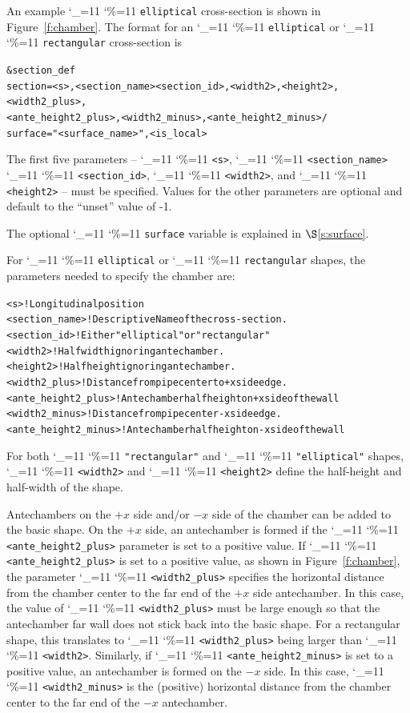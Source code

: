 \documentclass[11pt,openany]{report}
\newcommand{\sref}[1]{$\S$\ref{#1}}
\newcommand\ttcmd{\begingroup\catcode`\_=11 \catcode`\%=11 \dottcmd}
\newcommand\dottcmd[1]{\texttt{#1}\endgroup}
\newcommand{\fig}[1]{Figure~\ref{#1}}
\newcommand{\vn}{\ttcmd}
\newlength{\ExBeg}
\newlength{\ExEnd}
\newenvironment{example}
  {\vspace{\ExBeg} \begin{alltt}}
  {\end{alltt} \vspace{\ExEnd}}
\begin{document}
An example \vn{elliptical} cross-section is shown in
\fig{f:chamber}. The format for an \vn{elliptical} or \vn{rectangular}
cross-section is
\begin{example}
  &section_def 
    section = <s>, <section_name> <section_id>, <width2>, <height2>, <width2_plus>, 
              <ante_height2_plus>, <width2_minus>, <ante_height2_minus> /
    surface = "<surface_name>", <is_local>
\end{example}
The first five parameters -- \vn{<s>}, \vn{<section_name>}
\vn{<section_id>}, \vn{<width2>}, and \vn{<height2>} -- must be
specified. Values for the other parameters are optional and default to
the ``unset'' value of -1.

The optional \vn{surface} variable is explained in \sref{s:surface}.

For \vn{elliptical} or \vn{rectangular} shapes, the
parameters needed to specify the chamber are:
\begin{example}
  <s>                   ! Longitudinal position
  <section_name>        ! Descriptive Name of the cross-section.
  <section_id>          ! Either "elliptical" or "rectangular"
  <width2>              ! Half width ignoring antechamber.
  <height2>             ! Half height ignoring antechamber.
  <width2_plus>         ! Distance from pipe center to +x side edge.
  <ante_height2_plus>   ! Antechamber half height on +x side of the wall
  <width2_minus>        ! Distance from pipe center -x side edge.
  <ante_height2_minus>  ! Antechamber half height on -x side of the wall
\end{example}

For both \vn{"rectangular"} and \vn{"elliptical"} shapes, \vn{<width2>}
and \vn{<height2>} define the half-height and half-width of the shape.

Antechambers on the $+x$ side and/or $-x$ side of the chamber can be
added to the basic shape. On the $+x$ side, an antechamber is formed
if the \vn{<ante_height2_plus>} parameter is set to a positive value. If
\vn{<ante_height2_plus>} is set to a positive value, as shown in
\fig{f:chamber}, the parameter \vn{<width2_plus>} specifies the
horizontal distance from the chamber center to the far end of the $+x$
side antechamber. In this case, the value of \vn{<width2_plus>} must be
large enough so that the antechamber far wall does not stick back into
the basic shape. For a rectangular shape, this translates to
\vn{<width2_plus>} being larger than \vn{<width2>}. Similarly, if
\vn{<ante_height2_minus>} is set to a positive value, an antechamber is
formed on the $-x$ side.  In this case, \vn{<width2_minus>} is the
(positive) horizontal distance from the chamber center to the far end
of the $-x$ antechamber.
\end{document}
